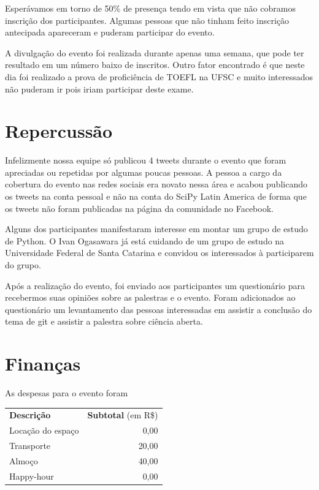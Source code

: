 \documentclass[12pt]{article}
\begin{document}
Esperávamos em torno de 50\% de presença tendo em vista que não cobramos
inscrição dos participantes.
Algumas pessoas que não tinham feito inscrição antecipada apareceram e puderam
participar do evento.

A divulgação do evento foi realizada durante apenas uma semana, que pode ter resultado em um número baixo de inscritos. Outro fator encontrado é que neste dia foi realizado a prova de proficiência de TOEFL na UFSC e muito interessados não puderam ir pois iriam participar deste exame.
\newpage

\section*{Repercussão}

Infelizmente nossa equipe só publicou 4 tweets durante o evento que foram
apreciadas ou repetidas por algumas poucas pessoas.
A pessoa a cargo da cobertura do evento nas redes sociais era novato nessa área
e acabou publicando os tweets na conta pessoal e não na conta do SciPy Latin
America de forma que os tweets não foram publicadas na página da comunidade no
Facebook.

Alguns dos participantes manifestaram interesse em montar um grupo de estudo de Python. O Ivan Ogasawara já está cuidando de um grupo de estudo na Universidade Federal de Santa Catarina e convidou os interessados à participarem do grupo.

Após a realização do evento, foi enviado aos participantes um questionário para recebermos suas opiniões sobre as palestras e o evento. Foram adicionados ao questionário um levantamento das pessoas interessadas em assistir a conclusão do tema de git e assistir a palestra sobre ciência aberta.

\newpage

\section*{Finanças}

As despesas para o evento foram

\begin{tabular}{p{}r}
  \textbf{Descrição} & \textbf{Subtotal} (em R\$) \\
  Locação do espaço & 0,00 \\
  Transporte & 20,00 \\ %
  Almoço & 40,00 \\ %
  Happy-hour & 0,00 \\ %
\end{tabular}
\end{document}
